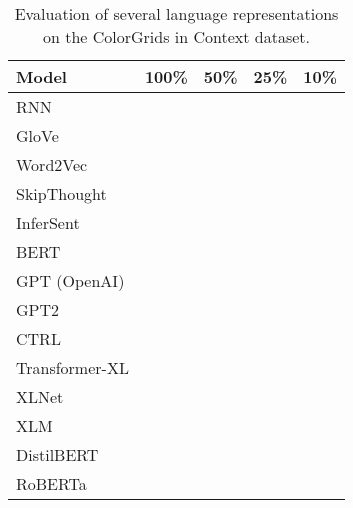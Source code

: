 \documentclass[11pt,a4paper]{article}
\begin{document}
\begin{table*}[t!]
\centering
\begin{tabular}{lcccc}
\hline
\textbf{Model} & \textbf{100\%} & \textbf{50\%} & \textbf{25\%} & \textbf{10\%} \\
\hline
RNN & & & & \\
GloVe & & & & \\
Word2Vec & & & & \\
SkipThought & & & & \\
InferSent & & & & \\
BERT & & & & \\
GPT (OpenAI) & & & & \\
GPT2 & & & & \\
CTRL & & & & \\
Transformer-XL & & & & \\
XLNet & & & & \\
XLM & & & & \\
DistilBERT & & & & \\
RoBERTa & & & & \\
\hline
\end{tabular}
\caption{\label{table:colors} Evaluation of several language representations on the ColorGrids in Context dataset.}
\end{table*}
\end{document}
